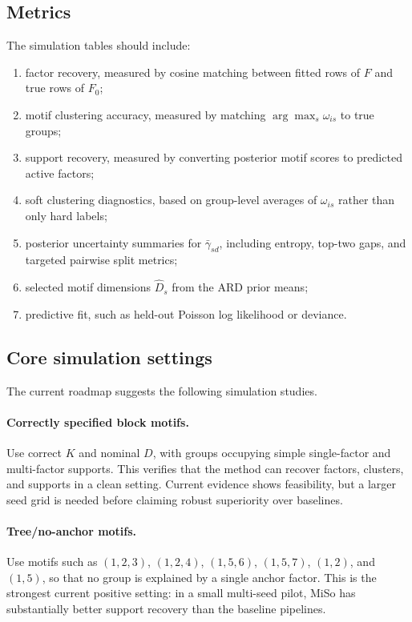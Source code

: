 \documentclass[11pt]{article}
\theoremstyle{plain}
\theoremstyle{definition}
\begin{document}
\subsection{Metrics}

The simulation tables should include:
\begin{enumerate}
  \item factor recovery, measured by cosine matching between fitted rows of
  $F$ and true rows of $F_0$;
  \item motif clustering accuracy, measured by matching $\arg\max_s\omega_{is}$
  to true groups;
  \item support recovery, measured by converting posterior motif scores to
  predicted active factors;
  \item soft clustering diagnostics, based on group-level averages of
  $\omega_{is}$ rather than only hard labels;
  \item posterior uncertainty summaries for $\bar{\gamma}_{sd}$, including
  entropy, top-two gaps, and targeted pairwise split metrics;
  \item selected motif dimensions $\widehat{D}_s$ from the ARD prior means;
  \item predictive fit, such as held-out Poisson log likelihood or deviance.
\end{enumerate}

\subsection{Core simulation settings}

The current roadmap suggests the following simulation studies.

\paragraph{Correctly specified block motifs.}
Use correct $K$ and nominal $D$, with groups occupying simple single-factor and
multi-factor supports. This verifies that the method can recover factors,
clusters, and supports in a clean setting. Current evidence shows feasibility,
but a larger seed grid is needed before claiming robust superiority over
baselines.

\paragraph{Tree/no-anchor motifs.}
Use motifs such as $(1,2,3)$, $(1,2,4)$, $(1,5,6)$, $(1,5,7)$, $(1,2)$, and
$(1,5)$, so that no group is explained by a single anchor factor. This is the
strongest current positive setting: in a small multi-seed pilot, MiSo has
substantially better support recovery than the baseline pipelines.
\end{document}
